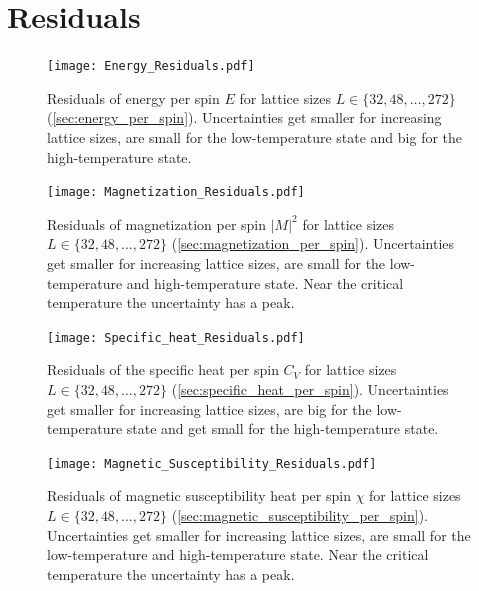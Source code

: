 \section{Residuals}\label{app:residuals}
\begin{figure}[H]
	\centering
	\texttt{[image: Energy\_Residuals.pdf]}
	\caption[Residuals of the energy per spin $E$]{Residuals of energy per spin $E$ for lattice sizes $L\in\{32, 48, \dots, 272\}$ (\cref{sec:energy_per_spin}). Uncertainties get smaller for increasing lattice sizes, are small for the low-temperature state and big for the high-temperature state.}
	\label{fig:energy_per_spin_residuals}
\end{figure}
\begin{figure}[H]
	\centering
	\texttt{[image: Magnetization\_Residuals.pdf]}
	\caption[Residuals of the magnetization per spin ${\lvert M \rvert}^2$]{Residuals of magnetization per spin ${\lvert M \rvert}^2$ for lattice sizes $L\in\{32, 48, \dots, 272\}$ (\cref{sec:magnetization_per_spin}). Uncertainties get smaller for increasing lattice sizes, are small for the low-temperature and high-temperature state. Near the critical temperature the uncertainty has a peak.}
	\label{fig:magnetization_per_spin_residuals}
\end{figure}
\begin{figure}[H]
	\centering
	\texttt{[image: Specific\_heat\_Residuals.pdf]}
	\caption[Residuals of the specific heat per spin $C_V$]{Residuals of the specific heat per spin $C_V$ for lattice sizes $L\in\{32, 48, \dots, 272\}$ (\cref{sec:specific_heat_per_spin}). Uncertainties get smaller for increasing lattice sizes, are big for the low-temperature state and get small for the high-temperature state.}
	\label{fig:specific_heat_per_spin_residuals}
\end{figure}
\begin{figure}[H]
	\centering
	\texttt{[image: Magnetic\_Susceptibility\_Residuals.pdf]}
	\caption[Residuals of the magnetic susceptibility per spin $C_V$]{Residuals of magnetic susceptibility heat per spin $\chi$ for lattice sizes $L\in\{32, 48, \dots, 272\}$ (\cref{sec:magnetic_susceptibility_per_spin}). Uncertainties get smaller for increasing lattice sizes, are small for the low-temperature and high-temperature state. Near the critical temperature the uncertainty has a peak.}
	\label{fig:magnetic_susceptibility_per_spin_residuals}
\end{figure}

